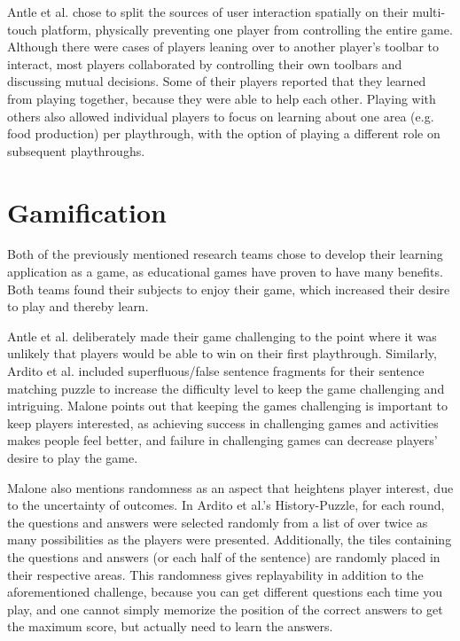 Antle et al. chose to split the sources of user interaction spatially on their multi-touch platform, physically preventing one player from controlling the entire game. Although there were cases of players leaning over to another player's toolbar to interact, most players collaborated by controlling their own toolbars and discussing mutual decisions. Some of their players reported that they learned from playing together, because they were able to help each other. Playing with others also allowed individual players to focus on learning about one area (e.g. food production) per playthrough, with the option of playing a different role on subsequent playthroughs.


\section{Gamification}

Both of the previously mentioned research teams chose to develop their learning application as a game, as educational games have proven to have many benefits\citep{Ardito}. Both teams found their subjects to enjoy their game, which increased their desire to play and thereby learn.

Antle et al. deliberately made their game challenging to the point where it was unlikely that players would be able to win on their first playthrough. Similarly, Ardito et al. included superfluous/false sentence fragments for their sentence matching puzzle to increase the difficulty level to keep the game challenging and intriguing. Malone\citep{Malone} points out that keeping the games challenging is important to keep players interested, as achieving success in challenging games and activities makes people feel better, and failure in challenging games can decrease players' desire to play the game.

Malone also mentions randomness as an aspect that heightens player interest, due to the uncertainty of outcomes. In Ardito et al.'s History-Puzzle, for each round, the questions and answers were selected randomly from a list of over twice as many possibilities as the players were presented. Additionally, the tiles containing the questions and answers (or each half of the sentence) are randomly placed in their respective areas. This randomness gives replayability in addition to the aforementioned challenge, because you can get different questions each time you play, and one cannot simply memorize the position of the correct answers to get the maximum score, but actually need to learn the answers.